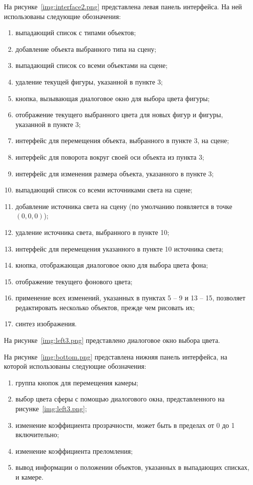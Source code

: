 На рисунке~\ref{img:interface2.png} представлена левая панель интерфейса.
На ней использованы следующие обозначения:
\begin{enumerate}
	\item выпадающий список с типами объектов;
	\item добавление объекта выбранного типа на сцену;
	\item выпадающий список со всеми объектами на сцене;
	\item удаление текущей фигуры, указанной в пункте 3;
	\item кнопка, вызывающая диалоговое окно для выбора цвета фигуры;
	\item отображение текущего выбранного цвета для новых фигур и фигуры, указанной в пункте 3;
	\item интерфейс для перемещения объекта, выбранного в пункте 3, на сцене;
	\item интерфейс для поворота вокруг своей оси объекта из пункта 3;
	\item интерфейс для изменения размера объекта, указанного в пункте 3;
	\item выпадающий список со всеми источниками света на сцене; 
	\item добавление источника света на сцену (по умолчанию появляется в точке $(0, 0, 0)$);
	\item удаление источника света, выбранного в пункте 10;
	\item интерфейс для перемещения указанного в пункте 10 источника света;
	\item кнопка, отображающая диалоговое окно для выбора цвета фона;
	\item отображение текущего фонового цвета;
	\item применение всех изменений, указанных в пунктах 5 -- 9 и 13 -- 15, позволяет редактировать несколько объектов, прежде чем рисовать их;
	\item синтез изображения.
\end{enumerate}
\newpage
На рисунке~\ref{img:left3.png} представлено диалоговое окно выбора цвета.

На рисунке~\ref{img:bottom.png} представлена нижняя панель интерфейса, на которой использованы следующие обозначения:
\begin{enumerate}
	\item группа кнопок для перемещения камеры;
	\item выбор цвета сферы с помощью диалогового окна, представленного на рисунке~\ref{img:left3.png};
	\item изменение коэффициента прозрачности, может быть в пределах от 0 до 1 включительно;
	\item изменение коэффициента преломления;
	\item вывод информации о положении объектов, указанных в выпадающих списках, и камере.
\end{enumerate}

